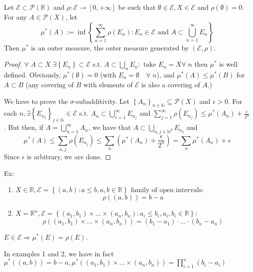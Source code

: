 \begin{proposition}
    Let \(\mathcal{E} \subset \mathcal{P}(\mathbb{R})\) and \(\rho : \mathcal{E} \to [0, +\infty]\) be such that \(\emptyset \in \mathcal{E}, X \in \mathcal{E}\) and \(\rho(\emptyset) = 0\). For any \(A \in \mathcal{P}(X)\), let 
    \[\mu^*(A) := \inf \left\lbrace \sum_{n=1}^{\infty} \rho (E_n) : E_n \in \mathcal{E} \mbox{ and } A \subset \bigcup_{n=1}^{\infty} E_n \right\rbrace\]
    Then \(\mu^*\) is an outer measure, the outer measure generated by \((\mathcal{E}, \rho)\).
\end{proposition}
\begin{proof}
    \(\forall \; A \subset X \; \exists \left\lbrace E_n \right\rbrace \subset \mathcal{E}\) s.t. \(A \subset \bigcup_n E_n : \mbox{ take } E_n = X \forall \; n\)
    then \(\mu^*\) is well defined. Obviously, \(\mu^*(\emptyset) = 0\) (with \(E_n = \emptyset \quad \forall\; n\)), and \(\mu^*(A) \leq \mu^*(B)\) for \(A \subset B\) (any covering of \(B\) with elements of \(\mathcal{E}\) is also a covering of \(A\).)

    We have to prove the \(\sigma\)-subadditivity. Let \(\left\lbrace A_n \right\rbrace_{n \in \mathbb{N}} \subseteq \mathcal{P}(X)\) and \(\epsilon > 0\). For each \(n, \exists \left\lbrace E_{n_j} \right\rbrace_{j \in \mathbb{N}} \in \mathcal{E}\) s.t. \(A_n \subset \bigcup_{i = 1}^{\infty} E_{n_j}\) and \(\sum_{j=1}^{\infty} \rho(E_{n_j}) \leq \mu^*(A_n) + \frac{\epsilon}{2^n}\).  
    But then, if \(A = \bigcup_{n=1}^{\infty} A_n\), we have that \(A \subset \bigcup_{n,j \in \mathbb{N}^2} E_{n_j}\) and
    \[
        \mu^*(A) \leq \sum_{n,j} \rho(E_{n_j}) \leq \sum_{n} \left(\mu^*(A_n) + \frac{\epsilon}{2^n}\right) = \sum_{n} \mu^*(A_n) + \epsilon
    \]
    Since \(\epsilon\) is arbitrary, we are done.
\end{proof}
Ex:  
\begin{enumerate}
    \item \(X \in \mathbb{R}, \mathcal{E} = \left\lbrace (a,b) : a \leq b, a,b \in \mathbb{R} \right\rbrace \mbox{ family of open intervals:} \)
    \[
        \rho((a,b)) = b-a
    \]
    
    \item \(X = \mathbb{R}^n, \mathcal{E} = \left\lbrace (a_1, b_1) \times \ldots \times (a_n, b_n) : a_i \leq b_i, a_i, b_i \in \mathbb{R} \right\rbrace\): 
    \[
        \rho((a_1, b_1)\times \ldots \times (a_n, b_n)) = (b_1 -a_1) \cdot \ldots \cdot (b_n - a_n)
    \]
\end{enumerate}
\begin{remark}
    \(E \in \mathcal{E} \Rightarrow \mu^*(E) = \rho(E)\).  

    In examples 1 and 2, we have in fact \(\mu^*((a,b)) = b-a, \mu^*\left((a_1, b_1) \times \ldots \times (a_n, b_n)\right) = \prod_{i=1}^{n} (b_i - a_i)\) 
\end{remark}
